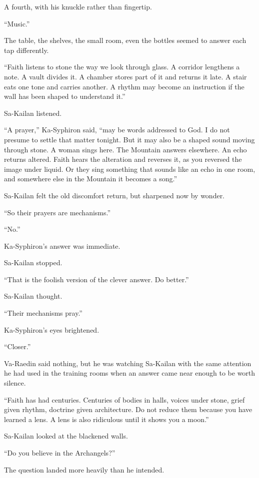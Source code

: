 A fourth, with his knuckle rather than fingertip.\par
“Music.”\par
The table, the shelves, the small room, even the bottles seemed to answer each tap differently.\par
“Faith listens to stone the way we look through glass. A corridor lengthens a note. A vault divides it. A chamber stores part of it and returns it late. A stair eats one tone and carries another. A rhythm may become an instruction if the wall has been shaped to understand it.”\par
Sa-Kailan listened.\par
“A prayer,” Ka-Syphiron said, “may be words addressed to God. I do not presume to settle that matter tonight. But it may also be a shaped sound moving through stone. A woman sings here. The Mountain answers elsewhere. An echo returns altered. Faith hears the alteration and reverses it, as you reversed the image under liquid. Or they sing something that sounds like an echo in one room, and somewhere else in the Mountain it becomes a song.”\par
Sa-Kailan felt the old discomfort return, but sharpened now by wonder.\par
“So their prayers are mechanisms.”\par
“No.”\par
Ka-Syphiron’s answer was immediate.\par
Sa-Kailan stopped.\par
“That is the foolish version of the clever answer. Do better.”\par
Sa-Kailan thought.\par
“Their mechanisms pray.”\par
Ka-Syphiron’s eyes brightened.\par
“Closer.”\par
Va-Raedin said nothing, but he was watching Sa-Kailan with the same attention he had used in the training rooms when an answer came near enough to be worth silence.\par
“Faith has had centuries. Centuries of bodies in halls, voices under stone, grief given rhythm, doctrine given architecture. Do not reduce them because you have learned a lens. A lens is also ridiculous until it shows you a moon.”\par
Sa-Kailan looked at the blackened walls.\par
“Do you believe in the Archangels?”\par
The question landed more heavily than he intended.\par
